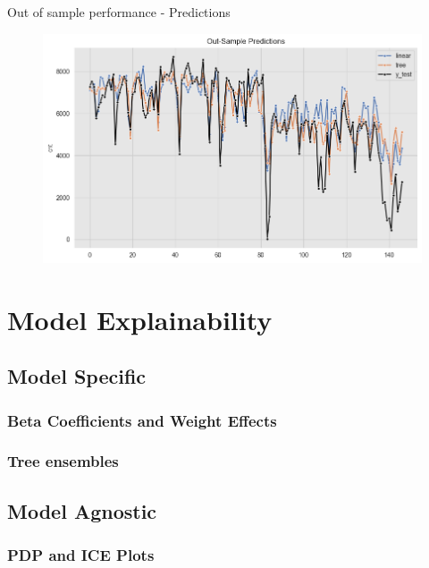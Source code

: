 \documentclass[10pt]{beamer}
\begin{document}
\begin{frame}{Out of sample performance - Predictions}
\begin{center}
  \begin{figure}
    \includegraphics[scale=0.45]{images/interpretable_ml_47_0.png} 
  \end{figure}
\end{center}
\end{frame}

\section{Model Explainability}

\subsection{Model Specific} 

\subsubsection{Beta Coefficients and Weight Effects}

\subsubsection{Tree ensembles}

\subsection{Model Agnostic}

\subsubsection{PDP and ICE Plots}
\end{document}
